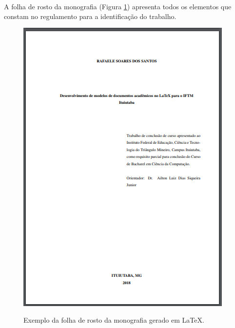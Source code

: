 \newpage
A folha de rosto da monografia (Figura \ref{folharostomon}) apresenta todos os elementos que constam no regulamento para a identificação do trabalho.\\
\begin{figure}[h]
	\centering
	\includegraphics{imagens/monografia/FolhaRosto.png}\\
	\caption{Exemplo da folha de rosto da monografia gerado em LaTeX.}
	\label{folharostomon}
\end{figure}

